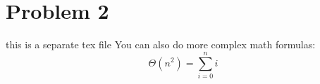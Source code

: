 \section*{Problem 2}

this is a separate tex file
You can also do more complex math formulas:
\[\Theta(n^2) = \sum_{i=0}^n i\]
